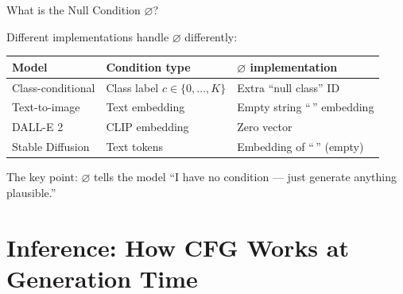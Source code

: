 \documentclass[aspectratio=169, 11pt]{beamer}
\begin{document}
\begin{frame}{What is the Null Condition $\varnothing$?}

Different implementations handle $\varnothing$ differently:

\bigskip

\begin{center}
\renewcommand{\arraystretch}{1.6}
\begin{tabular}{lll}
\toprule
\textbf{Model} & \textbf{Condition type} & \textbf{$\varnothing$ implementation} \\
\midrule
Class-conditional & Class label $c \in \{0,\ldots,K\}$ & Extra ``null class'' ID \\
Text-to-image & Text embedding & Empty string ``\,'' embedding \\
DALL-E 2 & CLIP embedding & Zero vector \\
Stable Diffusion & Text tokens & Embedding of ``\,'' (empty) \\
\bottomrule
\end{tabular}
\end{center}

\bigskip
The key point: $\varnothing$ tells the model ``I have no condition --- just generate anything plausible.''

\end{frame}

\section{Inference: How CFG Works at Generation Time}
\end{document}

